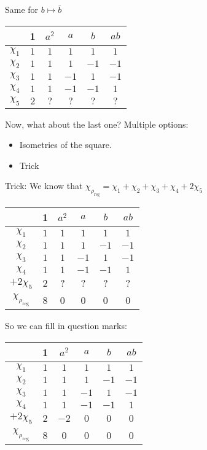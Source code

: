 Same for $b \mapsto  \overline{b}$

\begin{center}\begin{tabular}{cccccc}
    & 1 & $a^2$ & $a$ &  $b$ &  $ab$\\ \hline
    $\chi_{1}$ & $1$ & $1$ & $1$ & $1$ & $1$  \\
    $\chi_{2}$ & $1$ & $1$ & $1$ & $-1$ & $-1$  \\
    $\chi_{3}$ & $1$ & $1$ & $-1$ & $1$ & $-1$  \\
    $\chi_{4}$ & $1$ & $1$ & $-1$ & $-1$ & $1$  \\
    $\chi_{5}$ & $2$ & $?$ & $?$ & $?$ & $?$ 
\end{tabular}\end{center}

Now, what about the last one?
Multiple options:
\begin{itemize}
    \item Isometries of the square.
    \item Trick
\end{itemize}

Trick: We know that $\chi_{\rho_\text{reg}}  = \chi_{1} + \chi_{2} + \chi_{3} + \chi_{4} + 2 \chi_{5}$


\begin{center}\begin{tabular}{cccccc}
    & 1 & $a^2$ & $a$ &  $b$ &  $ab$\\ \hline
    $\chi_{1}$ & $1$ & $1$ & $1$ & $1$ & $1$  \\
    $\chi_{2}$ & $1$ & $1$ & $1$ & $-1$ & $-1$  \\
    $\chi_{3}$ & $1$ & $1$ & $-1$ & $1$ & $-1$  \\
    $\chi_{4}$ & $1$ & $1$ & $-1$ & $-1$ & $1$  \\
    $+ 2 \chi_{5}$ & $2$ & $?$ & $?$ & $?$ & $?$ \\ \hline
    $\chi_{\rho_\text{reg}}$ & 8 & 0& 0 & 0 & 0
\end{tabular}\end{center}

So we can fill in question marks:

\begin{center}\begin{tabular}{cccccc}
    & 1 & $a^2$ & $a$ &  $b$ &  $ab$\\ \hline
    $\chi_{1}$ & $1$ & $1$ & $1$ & $1$ & $1$  \\
    $\chi_{2}$ & $1$ & $1$ & $1$ & $-1$ & $-1$  \\
    $\chi_{3}$ & $1$ & $1$ & $-1$ & $1$ & $-1$  \\
    $\chi_{4}$ & $1$ & $1$ & $-1$ & $-1$ & $1$  \\
    $+ 2 \chi_{5}$ & $2$ & $-2$ & $0$ & $0$ & $0$ \\ \hline
    $\chi_{\rho_\text{reg}}$ & 8 & 0& 0 & 0 & 0
\end{tabular}\end{center}

